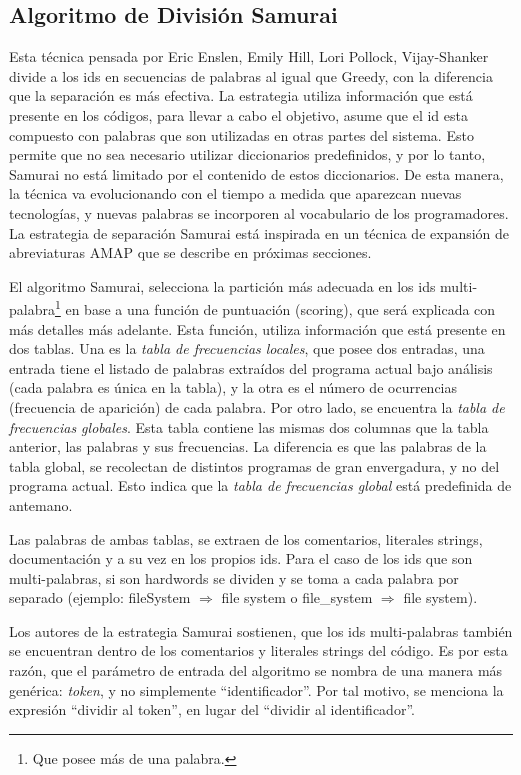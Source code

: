 \subsection{Algoritmo de División Samurai}
\label{sec:algSamu}

Esta técnica pensada por Eric Enslen, Emily Hill, Lori Pollock, Vijay-Shanker \cite{EHPV09} divide a los ids en secuencias de palabras al igual que Greedy, con la diferencia que la separación es más efectiva. La estrategia utiliza información que está presente en los códigos, para llevar a cabo el objetivo, asume que el id esta compuesto con palabras que son utilizadas en otras partes del sistema. Esto permite que no sea necesario utilizar diccionarios predefinidos, y por lo tanto, Samurai no está limitado por el contenido de estos diccionarios. De esta manera, la técnica va evolucionando con el tiempo a medida que aparezcan nuevas tecnologías, y nuevas palabras se incorporen al vocabulario de los programadores.
La estrategia de separación Samurai está inspirada en un técnica de expansión de abreviaturas AMAP \cite{EZH08} que se describe en próximas secciones.

El algoritmo Samurai, selecciona la partición más adecuada en los ids multi-palabra\footnote[1]{Que posee más de una palabra.} en base a una función de puntuación (scoring), que será explicada con más detalles más adelante. Esta función, utiliza información que está presente en dos tablas.
Una es la \textit{tabla de frecuencias locales}, que posee dos entradas, una entrada tiene el listado de palabras extraídos del programa actual bajo análisis (cada palabra es única en la tabla), y la otra es el número de ocurrencias (frecuencia de aparición) de cada palabra.
Por otro lado, se encuentra la \textit{tabla de frecuencias globales}. Esta tabla contiene las mismas dos columnas que la tabla anterior, las palabras y sus frecuencias. La diferencia es que las palabras de la tabla global, se recolectan de distintos programas de gran envergadura, y no del programa actual. Esto indica que la \textit{tabla de frecuencias global} está predefinida de antemano.

Las palabras de ambas tablas, se extraen de los comentarios, literales strings, documentación y a su vez en los propios ids. Para el caso de los ids que son multi-palabras, si son hardwords se dividen y se toma a cada palabra por separado (ejemplo: \textsf{fileSystem} $\Rightarrow$ \textsf{file system} o \textsf{file\_system} $\Rightarrow$ \textsf{file system}).

Los autores de la estrategia Samurai sostienen, que los ids multi-palabras también se encuentran dentro de los comentarios y literales strings del código. Es por esta razón, que el parámetro de entrada del algoritmo se nombra de una manera más genérica: \textit{token}, y no simplemente “identificador”. Por tal motivo, se menciona la expresión “dividir al token”, en lugar del “dividir al identificador”.

